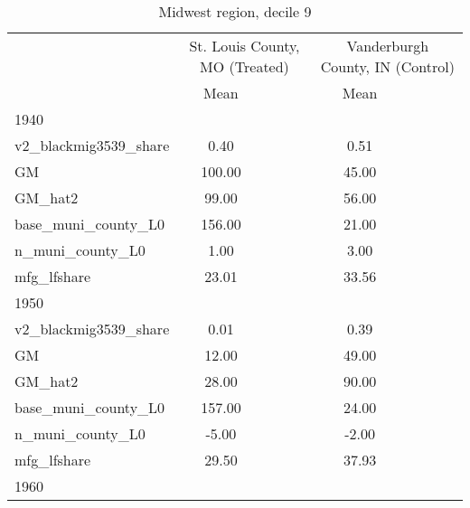 \begin{table}[htbp]\centering
\def\sym#1{\ifmmode^{#1}\else\(^{#1}\)\fi}
\caption{Midwest region, decile 9 \label{tab1}}
\begin{tabular}{l*{2}{ccc}}
\toprule
                    &\multicolumn{3}{c}{St. Louis County, MO (Treated)}&\multicolumn{3}{c}{Vanderburgh County, IN (Control)}\\
                    &        Mean&            &            &        Mean&            &            \\
\midrule
1940                &            &            &            &            &            &            \\
v2\_blackmig3539\_share&        0.40&            &            &        0.51&            &            \\
GM                  &      100.00&            &            &       45.00&            &            \\
GM\_hat2             &       99.00&            &            &       56.00&            &            \\
base\_muni\_county\_L0 &      156.00&            &            &       21.00&            &            \\
n\_muni\_county\_L0    &        1.00&            &            &        3.00&            &            \\
mfg\_lfshare         &       23.01&            &            &       33.56&            &            \\
\midrule
1950                &            &            &            &            &            &            \\
v2\_blackmig3539\_share&        0.01&            &            &        0.39&            &            \\
GM                  &       12.00&            &            &       49.00&            &            \\
GM\_hat2             &       28.00&            &            &       90.00&            &            \\
base\_muni\_county\_L0 &      157.00&            &            &       24.00&            &            \\
n\_muni\_county\_L0    &       -5.00&            &            &       -2.00&            &            \\
mfg\_lfshare         &       29.50&            &            &       37.93&            &            \\
\midrule
1960                &            &            &            &            &            &            \\

\end{tabular}
\end{table}
